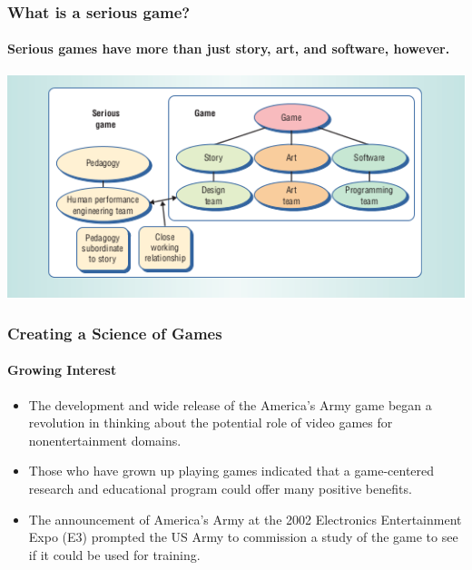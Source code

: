 \begin{frame}
\frametitle{What is a serious game?}
\framesubtitle{Serious games have more than just story, art, and
software, however.}
\begin{center}
\includegraphics[scale=.75]{serious.png}
\end{center}
\end{frame}


\begin{frame}
\frametitle{Creating a Science of Games}
\framesubtitle{Growing Interest}
\begin{itemize}[<+->]
\item
The development and wide release of the America's Army game began a
\alert{revolution} in thinking about the potential role of video games for
\alert{nonentertainment} domains.
\item
Those who have grown up playing games indicated that a game-centered research
and educational program could offer many positive benefits.
\item
The announcement of America's Army at the 2002 Electronics Entertainment Expo
(E3) prompted the US Army to commission a study of the game to see if it could
be used for training.
\end{itemize}
\end{frame}

